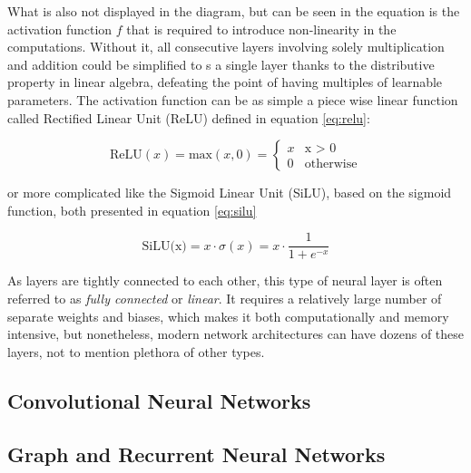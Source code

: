 What is also not displayed in the diagram, but can be seen in the equation is the activation function \(f\) that is required to introduce non-linearity in the computations. Without it, all consecutive layers involving solely multiplication and addition could be simplified to s a single layer thanks to the distributive property in linear algebra, defeating the point of having multiples of learnable parameters. The activation function can be as simple a piece wise linear function called Rectified Linear Unit (ReLU) defined in equation \ref{eq:relu}:

\begin{equation}\label{eq:relu}
  \text{ReLU}(x) = \text{max}(x, 0) = 
  \begin{cases}
    x & \text{x > 0} \\
    0 & \text{otherwise}
  \end{cases}
\end{equation}

or more complicated like the Sigmoid Linear Unit (SiLU), based on the sigmoid function, both presented in equation \ref{eq:silu}

\begin{equation}\label{eq:silu}
  \text{SiLU(x)} = x \cdot \sigma (x) = x \cdot \frac{1}{1 + e^{-x}}
\end{equation}

As layers are tightly connected to each other, this type of neural layer is often referred to as \textit{fully connected} or \textit{linear}. It requires a relatively large number of separate weights and biases, which makes it both computationally and memory intensive, but nonetheless, modern network architectures can have dozens of these layers, not to mention plethora of other types.


\subsection{Convolutional Neural Networks}
\indo{|}
\indo{|}
\indo{|}
\indo{|}
\indo{|}


\subsection{Graph and Recurrent Neural Networks}
\indo{|}
\indo{|}
\indo{|}
\indo{|}
\indo{|}
\indo{|}
\indo{|}
\indo{|}
\indo{|}
\indo{|}


